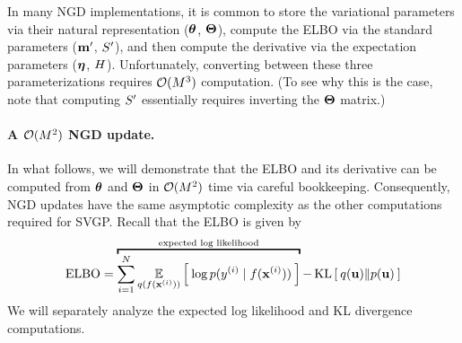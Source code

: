 In many NGD implementations, it is common to store the variational parameters via their natural representation ($\boldsymbol{\theta}$, $\boldsymbol{\Theta}$), compute the ELBO via the standard parameters ($\mathbf{m}'$, $S'$), and then compute the derivative via the expectation parameters ($\boldsymbol{\eta}$, $H$).
Unfortunately, converting between these three parameterizations requires $\bigo{M^3}$ computation.
(To see why this is the case, note that computing $S'$ essentially requires inverting the $\boldsymbol{\Theta}$ matrix.)

\paragraph{A $\bigo{M^2}$ NGD update.}
In what follows, we will demonstrate that the ELBO and its derivative can be computed from $\boldsymbol{\theta}$ and $\boldsymbol{\Theta}$ in $\bigo{M^2}$ time via careful bookkeeping.
Consequently, NGD updates have the same asymptotic complexity as the other computations required for SVGP.
Recall that the ELBO is given by
\[
  \text{ELBO} = \overbracket{ \sum_{i=1}^N \Evover{q(f(\bx^{(i)}))}{  \: \log p( y^{(i)} \mid f(\bx^{(i)}) ) \: }}^{\text{expected log likelihood}} - \kl{ q(\bu) }{ p(\bu) }
\]
We will separately analyze the expected log likelihood and KL divergence computations.

